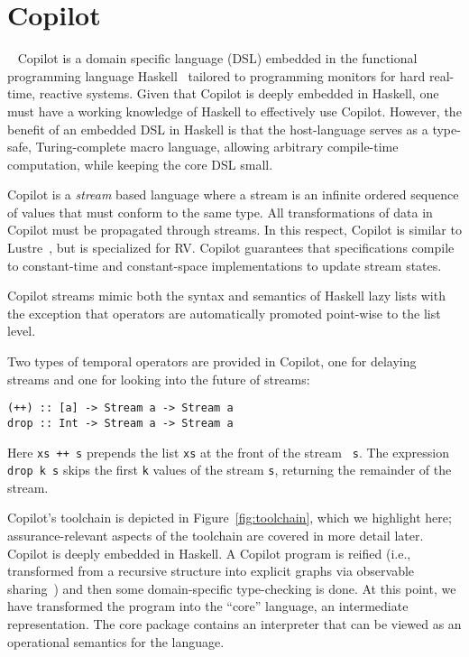 \section{Copilot}~\label{sec:copilot} 
Copilot is a domain specific language (DSL)  embedded in the functional
programming language Haskell~\cite{Haskell98}   tailored to
programming monitors for hard real-time, reactive systems. Given that
Copilot is deeply embedded in Haskell, one must have a working
knowledge of Haskell to effectively use Copilot. However, the benefit of an
embedded DSL in Haskell is that the host-language serves as a type-safe,
Turing-complete macro language, allowing arbitrary compile-time computation,
while keeping the core DSL small.

Copilot is a \emph{stream} based language where a stream is an infinite ordered
sequence of values that must conform to the same type.  All transformations of
data in Copilot must be propagated through streams.  In this respect, Copilot is
similar to Lustre~\cite{CaspiPHP87}, but is specialized for RV. Copilot
guarantees that specifications compile to constant-time and constant-space
implementations to update stream states. 

Copilot streams mimic both the syntax and semantics of
Haskell lazy lists with the exception that  operators are
automatically promoted point-wise to the list level.

Two types of temporal operators are provided in Copilot, one for
delaying streams and one for looking into the future of streams:
\begin{lstlisting}[frame=single]
(++) :: [a] -> Stream a -> Stream a
drop :: Int -> Stream a -> Stream a
\end{lstlisting}
%
Here {\tt xs ++ s} prepends the list {\tt xs} at the front of the stream {\tt
  s}.  The expression {\tt drop k s} skips the first {\tt k} values of the
stream {\tt s}, returning the remainder of the stream.



Copilot's toolchain is depicted in Figure~\ref{fig:toolchain}, which we
highlight here; assurance-relevant aspects of the toolchain are covered in more
detail later.  Copilot is deeply embedded in Haskell.  A Copilot program is
reified (i.e., transformed from a recursive structure into explicit graphs via
observable sharing~\cite{gill}) and then some domain-specific type-checking is
done.  At this point, we have transformed the program into the ``core''
language, an intermediate representation.  The core package contains
an  interpreter  that can be viewed as an operational semantics for
the language. 



